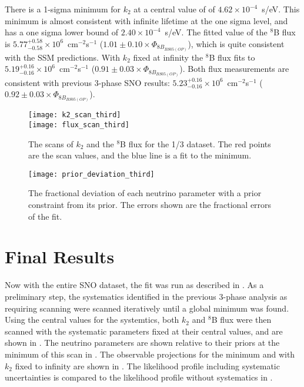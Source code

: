 There is a 1-sigma minimum for $k_2$ at a central value of of $4.62\times10^{-4}$~s/eV.
This minimum is almost consistent with infinite lifetime at the one sigma level, and has a one sigma lower bound of $2.40\times10^{-4}$~s/eV.
The fitted value of the $^8$B flux is $5.77^{+0.58}_{-0.58}\times10^6$~cm$^{-2}$s$^{-1}$ ($1.01\pm0.10 \times \Phi_{8B_{BS05(OP)}}$), which is quite consistent with the SSM predictions.
With $k_2$ fixed at infinity the $^8$B flux fits to $5.19^{+0.16}_{-0.16}\times10^6$~cm$^{-2}$s$^{-1}$ ($0.91\pm0.03 \times \Phi_{8B_{BS05(OP)}}$).
Both flux measurements are consistent with previous 3-phase SNO results: $5.23^{+0.16}_{-0.16}\times10^6$~cm$^{-2}$s$^{-1}$ ($0.92\pm0.03 \times \Phi_{8B_{BS05(OP)}}$).

\begin{figure}
\centering
\texttt{[image: k2\_scan\_third]} \\
\vspace{12pt}
\texttt{[image: flux\_scan\_third]}
\caption{The scans of $k_2$ and the $^8$B flux for the 1/3 dataset. The red points are the scan values, and the blue line is a fit to the minimum.}
\label{fig:third_scans}
\end{figure}

\begin{figure}
\centering
\texttt{[image: prior\_deviation\_third]}
\caption{The fractional deviation of each neutrino parameter with a prior constraint from its prior. The errors shown are the fractional errors of the fit.}
\label{fig:priors_third}
\end{figure}

\clearpage

\section{Final Results}
\label{final}

Now with the entire SNO dataset, the fit was run as described in . 
As a preliminary step, the systematics identified in the previous 3-phase analysis as requiring scanning were scanned iteratively until a global minimum was found.
Using the central values for the systemtics, both $k_2$ and $^8$B flux were then scanned with the systematic parameters fixed at their central values, and are shown in .
The neutrino parameters are shown relative to their priors at the minimum of this scan in .
The observable projections for the minimum and with $k_2$ fixed to infinity are shown in .
The likelihood profile including systematic uncertainties is compared to the likelihood profile without systematics in .

